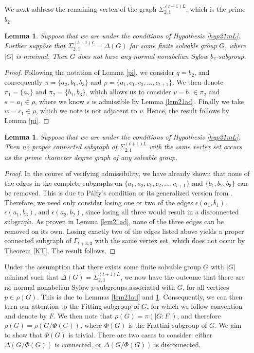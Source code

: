 \documentclass[11pt]{amsart}
\newtheorem{lemma}[theorem]{Lemma}
\theoremstyle{definition}
\theoremstyle{remark}
\numberwithin{equation}{section}
\newcommand{\SLi}[3]{\Sigma_{#1,#2}^{#3L}} %
\begin{document}
We next address the remaining vertex of the graph $\SLi{2}{1}{(t+1)}$, which is the prime $b_2$.

\begin{lemma}\label{lem21pi}
Suppose that we are under the conditions of Hypothesis \ref{hyp21mL}. Further suppose that $\SLi{2}{1}{(t+1)}=\Delta(G)$ for some finite solvable group $G$, where $|G|$ is minimal. Then $G$ does not have any normal nonabelian Sylow $b_2$-subgroup.
\end{lemma}
\begin{proof}
Following the notation of Lemma \ref{pi}, we consider $q=b_2$, and consequently $\pi=\{a_2,b_1,b_3\}$ and $\rho=\{a_1,c_1,c_2,\ldots,c_{t+1}\}$. We then denote $\pi_1=\{a_2\}$ and $\pi_2=\{b_1,b_3\}$, which allows us to consider $v=b_1\in\pi_2$ and $s=a_1\in\rho$, where we know $s$ is admissible by Lemma \ref{lem21ad}. Finally we take $w=c_1\in\rho$, which we note is not adjacent to $v$. Hence, the result follows by Lemma \ref{pi}.
\end{proof}

\begin{lemma}\label{lem21mLcon}
Suppose that we are under the conditions of Hypothesis \ref{hyp21mL}. Then no proper connected subgraph of $\SLi{2}{1}{(t+1)}$ with the same vertex set occurs as the prime character degree graph of any solvable group.
\end{lemma}
\begin{proof}
In the course of verifying admissibility, we have already shown that none of the edges in the complete subgraphs on $\{a_1,a_2,c_1,c_2,\ldots,c_{t+1}\}$ and $\{b_1,b_2,b_3\}$ can be removed. This is due to P\'alfy's condition or its generalized version from \cite{A}. Therefore, we need only consider losing one or two of the edges $\epsilon(a_1,b_1)$, $\epsilon(a_1,b_3)$, and $\epsilon(a_2,b_2)$, since losing all three would result in a disconnected subgraph. As proven in Lemma \ref{lem21ad}, none of the three edges can be removed on its own. Losing exactly two of the edges listed above yields a proper connected subgraph of $\Gamma_{t+3,3}$ with the same vertex set, which does not occur by Theorem \ref{KT}. The result follows.
\end{proof}

Under the assumption that there exists some finite solvable group $G$ with $|G|$ minimal such that $\Delta(G)=\SLi{2}{1}{(t+1)}$, we now have the outcome that there are no normal nonabelian Sylow $p$-subgroups associated with $G$, for all vertices $p\in\rho(G)$. This is due to Lemmas \ref{lem21ad} and \ref{lem21pi}. Consequently, we can then turn our attention to the Fitting subgroup of $G$, for which we follow convention and denote by $F$. We then note that $\rho(G)=\pi(|G:F|)$, and therefore $\rho(G)=\rho(G/\Phi(G))$, where $\Phi(G)$ is the Frattini subgroup of $G$. We aim to show that $\Phi(G)$ is trivial. There are two cases to consider: either $\Delta(G/\Phi(G))$ is connected, or $\Delta(G/\Phi(G))$ is disconnected.
\end{document}
